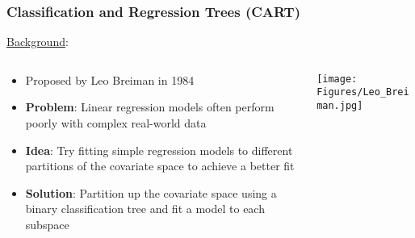 \documentclass{beamer}
\begin{document}
\begin{frame}

    \frametitle{Classification and Regression Trees (CART)}
    
    \underline{Background}:
    
    \begin{columns}
        \begin{column}{0.6\textwidth}
            \begin{itemize}
                \item Proposed by Leo Breiman in 1984
                \item \textbf{Problem}: Linear regression models often 
                      perform poorly with complex real-world data
                \item \textbf{Idea}: Try fitting simple regression models to 
                      different partitions of the covariate space to achieve a 
                      better fit
                \item \textbf{Solution}: Partition up the covariate space using
                      a binary classification tree and fit a model to each 
                      subspace
            \end{itemize}
        \end{column}
        \begin{column}{0.4\textwidth}
            \begin{center}
                \texttt{[image: Figures/Leo\_Breiman.jpg]}
            \end{center}
        \end{column}
    \end{columns}

\end{frame}


\end{document}
